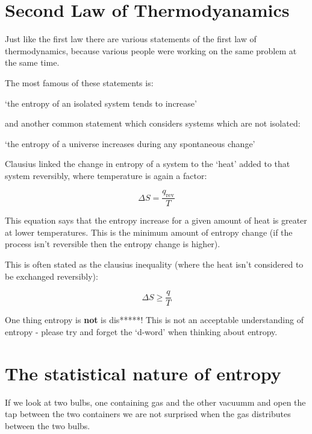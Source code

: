 \documentclass[
]{book}
\begin{document}
\hypertarget{sec:2ndlaw}{%
\section{Second Law of Thermodyanamics}\label{sec:2ndlaw}}

Just like the first law there are various statements of the first law of thermodynamics, because various people were working on the same problem at the same time.

The most famous of these statements is:

`the entropy of an isolated system tends to increase'

and another common statement which considers systems which are not isolated:

`the entropy of a universe increases during any spontaneous change'

Clausius linked the change in entropy of a system to the `heat' added to that system reversibly, where temperature is again a factor:

\begin{equation}
\Delta S=\frac{q_{\textrm{rev}}}{T}
\label{eq:clausius}
\end{equation}

This equation says that the entropy increase for a given amount of heat is greater at lower temperatures. This is the minimum amount of entropy change (if the process isn't reversible then the entropy change is higher).

This is often stated as the clausius inequality (where the heat isn't considered to be exchanged reversibly):

\begin{equation}
\Delta S \geq \frac {q}{T}
\label{eq:clausiusineq}
\end{equation}

One thing entropy is \textbf{not} is dis*****! This is not an acceptable understanding of entropy - please try and forget the `d-word' when thinking about entropy.

\hypertarget{the-statistical-nature-of-entropy}{%
\section{The statistical nature of entropy}\label{the-statistical-nature-of-entropy}}

If we look at two bulbs, one containing gas and the other vacuumm and open the tap between the two containers we are not surprised when the gas distributes between the two bulbs.
\end{document}
